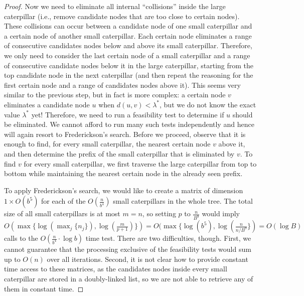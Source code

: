 \documentclass[a4paper,UKenglish]{lipics-v2016}
\theoremstyle{plain}
\begin{document}
\begin{proof}
Now we need to eliminate all internal ``collisions'' inside the large caterpillar (i.e., remove candidate nodes that
are too close to certain nodes). These collisions can occur between a candidate node of one small caterpillar
and a certain node of another small caterpillar. Each certain node eliminates a range of consecutive
candidates nodes below and above its small caterpillar. Therefore, we only need to consider the 
last certain node of a small caterpillar and a range of consecutive candidate nodes below it in the
large caterpillar, starting from the top candidate node in the next caterpillar (and then repeat
the reasoning for the first certain node and a range of candidates nodes above it). This seems very similar
to the previous step, but in fact is more complex: a certain node $v$ eliminates a candidate node $u$ when
$d(u,v)<\lambda^{*}$, but we do not know the exact value $\lambda^{*}$ yet! Therefore, we need to run
a feasibility test to determine if $u$ should be eliminated. We cannot afford to run many such tests
independently and hence will again resort to Frederickson's search. Before we proceed, observe that
it is enough to find, for every small caterpillar, the nearest certain node $v$ above it, and then determine
the prefix of the small caterpillar that is eliminated by $v$. To find $v$ for every small caterpillar,
we first traverse the large caterpillar from top to bottom while maintaining the nearest certain node
in the already seen prefix.

To apply Frederickson's search, we would like to create a matrix of dimension $1\times O(b^{5})$
for each of the $O(\frac{n}{b^{4}})$ small caterpillars in the whole tree. The total size of all small
caterpillars is at most $m=n$, so setting $p$ to $\frac{n}{B^9}$ would imply
$O(\max \lbrace \log(\max_{j} \lbrace n_j \rbrace), \log(\frac{m}{p+1}) \rbrace) = O(\max \lbrace \log (b^{5}), \log(\frac{n}{n/B^{9}} \rbrace) = O(\log B)$ calls to the $O(\frac{n}{b^{4}} \cdot \log b)$ time test.
There are two difficulties, though. First, we cannot guarantee that the processing exclusive of the feasibility tests
would sum up to $O(n)$ over all iterations. Second, it is not clear how to provide constant time access
to these matrices, as the candidates nodes inside every small caterpillar are stored in a doubly-linked list,
so we are not able to retrieve any of them in constant time. 


\end{proof}
\end{document}
